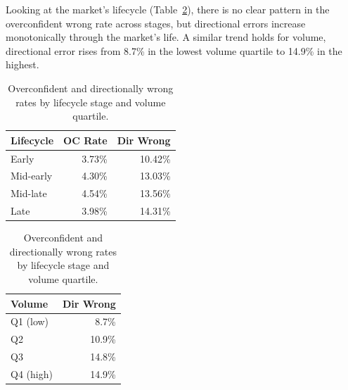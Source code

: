 \documentclass[11pt,twocolumn]{article}
\begin{document}
Looking at the market's lifecycle (Table~\ref{tab:lifecycle_volume}), there is no clear pattern in the overconfident wrong rate across stages, but directional errors increase monotonically through the market's life. A similar trend holds for volume, directional error rises from 8.7\% in the lowest volume quartile to 14.9\% in the highest.

\begin{table}[h]
\centering
\footnotesize
\setlength{\tabcolsep}{4pt}
\begin{minipage}{0.54\columnwidth}
    \centering
    \begin{tabular}{lrr}
    \toprule
    \textbf{Lifecycle} & \textbf{OC Rate} & \textbf{Dir Wrong} \\
    \midrule
    Early     & 3.73\% & 10.42\% \\
    Mid-early & 4.30\% & 13.03\% \\
    Mid-late  & 4.54\% & 13.56\% \\
    Late      & 3.98\% & 14.31\% \\
    \bottomrule
    \end{tabular}
\end{minipage}
\hfill
\begin{minipage}{0.38\columnwidth}
    \centering
    \begin{tabular}{lr}
    \toprule
    \textbf{Volume} & \textbf{Dir Wrong} \\
    \midrule
    Q1 (low)  & 8.7\%  \\
    Q2        & 10.9\% \\
    Q3        & 14.8\% \\
    Q4 (high) & 14.9\% \\
    \bottomrule
    \end{tabular}
\end{minipage}
\caption{Overconfident and directionally wrong rates by lifecycle stage and volume quartile.}
\label{tab:lifecycle_volume}
\end{table}
\end{document}
